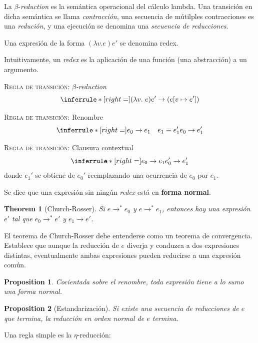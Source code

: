 \documentclass[article, 12pt]{article}
\newtheorem{theorem}{Theorem}
\newtheorem{proposition}{Proposition}
\newtheorem{theorem}{Theorem}
\begin{document}
La $\beta$-\textit{reduction} es la semántica operacional del cálculo lambda.
Una transición en dicha semántica se llama \textit{contracción}, una secuencia
de mútilples contracciones es una \textit{redución}, y una ejecución se denomina
una \textit{secuencia de reducciones}.

\begin{definition}
  Una expresión de la forma $(\lambda v. e)e'$ se denomina redex.
\end{definition}

Intuitivamente, un \textit{redex} es la aplicación de una función (una
abstracción) a un argumento.

\textsc{Regla de transición:} $\beta$\textit{-reduction}
\[
\inferrule* [right=] {}{(\lambda v.\ e)e' \to (e[v \mapsto e'])}
\]

\textsc{Regla de transición:} Renombre
\[
\inferrule* [right=] {e_0 \to e_1 \quad e_1 \equiv e_1'}{e_0 \to e_1'}
\]

\textsc{Regla de transición:} Clausura contextual
\[
\inferrule* [right=] {e_0 \to e_1}{e_0' \to e_1'}
\]
donde $e_1'$ se obtiene de $e_0'$ reemplazando una ocurrencia de $e_0$ por
$e_1$.

\begin{definition}
  Se dice que una expresión sin ningún \textit{redex} está en \textbf{forma
  normal}.
\end{definition}

\begin{theorem}[Church-Rosser]
  Si $e \to^* e_0$ y $e \to^* e_1$, entonces hay una expresión $e'$ tal que 
  $e_0\to^* e'$ y $e_1 \to e'$.
\end{theorem}

El teorema de Church-Rosser debe entenderse como un teorema de convergencia.
Establece que aunque la reducción de $e$ diverja y conduzca a dos expresiones
distintas, eventualmente ambas expresiones pueden reducirse a una expresión
común. 

\begin{proposition}
  Cocientada sobre el renombre, toda expresión tiene a lo sumo una forma normal.
\end{proposition}

\begin{proposition}[Estandarización]
  Si existe una secuencia de reducciones de $e$ que termina, la reducción en
  orden normal de $e$ termina.
\end{proposition}

Una regla simple es la $\eta$-reducción:
\end{document}
